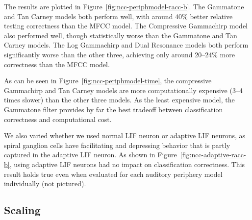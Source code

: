 
The results are plotted
in Figure~\ref{fig:ncc-periphmodel-racc-b}.
The Gammatone and Tan Carney models
both perform well,
with around 40\% better relative testing correctness
than the MFCC model.
The Compressive Gammachirp model
also performed well,
though statistically worse
than the Gammatone and Tan Carney models.
The Log Gammachirp and Dual Resonance models
both perform significantly worse
than the other three,
achieving only around 20--24\%
more correctness than the MFCC model.


As can be seen in Figure~\ref{fig:ncc-periphmodel-time},
the compressive Gammachirp
and Tan Carney models are
more computationally expensive
(3--4 times slower)
than the other three models.
As the least expensive model,
the Gammatone filter
provides by far the best tradeoff
between classification correctness
and computational cost.


We also varied whether we used
normal LIF neuron or adaptive LIF neurons,
as spiral ganglion cells
have facilitating and depressing behavior
that is partly captured in the adaptive LIF neuron.
As shown in Figure~\ref{fig:ncc-adaptive-racc-b},
using adaptive LIF neurons had no impact
on classification correctness.
This result holds true even when
evaluated for each auditory periphery model
individually (not pictured).

\subsection{Scaling}
\label{sec:res-ncc-scaling}

